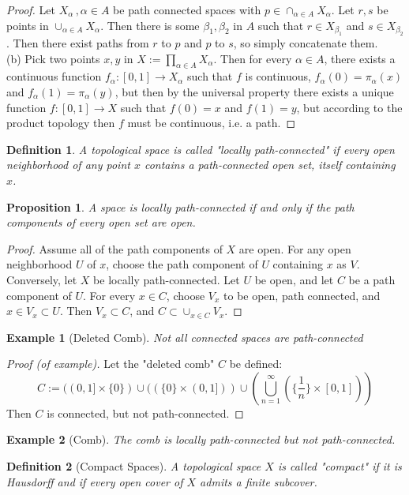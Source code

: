 \documentclass{article}
\newtheorem{example}{Example}
\newtheorem{proposition}{Proposition}
\newtheorem{definition}{Definition}
\begin{document}
\begin{proof}
	Let $X_\alpha\,,\alpha\in A$ be path connected spaces with $p\in\cap_{\alpha\in A}X_\alpha$.  Let $r,s$ be points in $\cup_{\alpha\in A}X_\alpha$.  Then there is some $\beta_1,\beta_2$ in $A$ such that $r\in X_{\beta_1}$ and $s\in X_{\beta_2}$.  Then there exist paths from $r$ to $p$ and $p$ to $s$, so simply concatenate them.\\
	(b) Pick two points $x,y$ in $X:=\prod_{\alpha\in A}X_\alpha$.  Then for every $\alpha\in A$, there exists a continuous function $f_\alpha: [0,1]\to X_\alpha$ such that $f$ is continuous, $f_\alpha(0)=\pi_\alpha(x)$ and $f_\alpha(1)=\pi_\alpha(y)$, but then by the universal property there exists a unique function $f:[0,1]\to X$ such that $f(0)=x$ and $f(1)=y$, but according to the product topology then $f$ must be continuous, i.e. a path.
\end{proof}
\begin{definition}
	A topological space is called "locally path-connected" if every open neighborhood of any point $x$ contains a path-connected open set, itself containing $x$.
\end{definition}
\begin{proposition}
	A space is locally path-connected if and only if the path components of every open set are open.
\end{proposition}
\begin{proof}
	Assume all of the path components of $X$ are open.  For any open neighborhood $U$ of $x$, choose the path component of $U$ containing $x$ as $V$.  Conversely, let $X$ be locally path-connected.  Let $U$ be open, and let $C$ be a path component of $U$.  For every $x\in C$, choose $V_x$ to be open, path connected, and $x\in V_x\subset U$.  Then $V_x\subset C$, and $C\subset\cup_{x\in C}V_x$.
\end{proof}
\begin{example}[Deleted Comb]
	Not all connected spaces are path-connected
\end{example}
\begin{proof}[Proof (of example)]
Let the "deleted comb" $C$ be defined: $$C:=((0,1] \times \{0\}) \cup ((\{0\}\times (0,1])) \cup (\bigcup_{n=1}^{\infty}(\{\frac{1}{n}\}\times [0,1]))$$
Then $C$ is connected, but not path-connected.
\end{proof}
\begin{example}[Comb]
	The comb is locally path-connected but not path-connected.
\end{example}
\begin{definition}[Compact Spaces]
	A topological space $X$ is called "compact" if it is Hausdorff and if every open cover of $X$ admits a finite subcover.
\end{definition}
\end{document}
